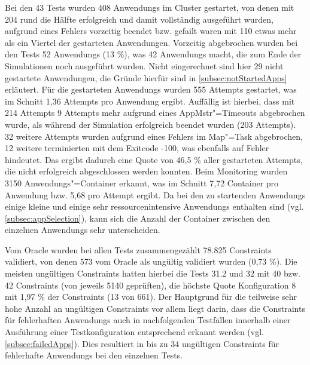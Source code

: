 Bei den 43 \glspl{Test} wurden 408 \glspl{Anwendung} im Cluster gestartet, von denen mit 204 rund die Hälfte erfolgreich und damit vollständig ausgeführt wurden, aufgrund eines Fehlers vorzeitig beendet bzw. gefailt waren mit 110 etwas mehr als ein Viertel der gestarteten Anwendungen.
Vorzeitig abgebrochen wurden bei den \glspl{Test} 52 \glspl{Anwendung} (13 \%), was 42 \glspl{Anwendung} macht, die zum Ende der Simulationen noch ausgeführt wurden.
Nicht eingerechnet sind hier 29 nicht gestartete Anwendungen, die Gründe hierfür sind in \cref{subsec:notStartedApps} erläutert.
Für die gestarteten \glspl{Anwendung} wurden 555 \glspl{Attempt} gestartet, was im Schnitt 1,36 \glspl{Attempt} pro \gls{Anwendung} ergibt.
Auffällig ist hierbei, dass mit 214 \glspl{Attempt} 9 \glspl{Attempt} mehr aufgrund eines \gls{AppMstr}"=Timeouts abgebrochen wurde, als während der Simulation erfolgreich beendet wurden (203 Attempts).
32 weitere \glspl{Attempt} wurden aufgrund eines Fehlers im Map"=Task abgebrochen, 12 weitere terminierten mit dem Exitcode -100, was ebenfalls auf Fehler hindeutet.
Das ergibt dadurch eine Quote von 46,5 \% aller gestarteten Attempts, die nicht erfolgreich abgeschlossen werden konnten.
Beim Monitoring wurden 3150 Anwendungs"=Container erkannt, was im Schnitt 7,72 \gls{Container} pro \gls{Anwendung} bzw. 5,68 pro \gls{Attempt} ergibt.
Da bei den zu startenden \glspl{Anwendung} einige kleine und einige sehr ressourcenintensive \glspl{Anwendung} enthalten sind (vgl. \cref{subsec:appSelection}), kann sich die Anzahl der \gls{Container} zwischen den einzelnen \glspl{Anwendung} sehr unterscheiden.

Vom Oracle wurden bei allen \glspl{Test} zusammengezählt 78.825 Constraints validiert, von denen 573 vom Oracle als ungültig validiert wurden (0,73 \%).
Die meisten ungültigen Constraints hatten hierbei die \glspl{Test} 31.2 und 32 mit 40 bzw. 42 Constraints (von jeweils 5140 geprüften), die höchste Quote Konfiguration 8 mit 1,97 \% der Constraints (13 von 661).
Der Hauptgrund für die teilweise sehr hohe Anzahl an ungültigen Constraints vor allem liegt darin, dass die Constraints für fehlerhaften \glspl{Anwendung} auch in nachfolgenden Testfällen innerhalb einer Ausführung einer \gls{Testkonfiguration} entsprechend erkannt werden (vgl. \cref{subsec:failedApps}).
Dies resultiert in bis zu 34 ungültigen Constraints für fehlerhafte \glspl{Anwendung} bei den einzelnen Tests.

